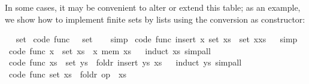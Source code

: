 \begin{isabellebody}
\begin{isamarkuptext}
  In some cases, it may be convenient to alter or
  extend this table;  as an example, we show
  how to implement finite sets by lists
  using the conversion 
  as constructor:%
\end{isamarkuptext}%
\isamarkuptrue%
\ %
\isadelimML
%
\endisadelimML
%
\isatagML
%
\endisatagML
{\isafoldML}%
%
\isadelimML
%
\endisadelimML
\isanewline
{}\isamarkupfalse%
\ set\isanewline
\isanewline
{}\isamarkupfalse%
\ {\isacharbrackleft}code\ func{\isacharbrackright}{\isacharcolon}\ {\isachardoublequoteopen}{\isacharbraceleft}{\isacharbraceright}\ {\isacharequal}\ set\ {\isacharbrackleft}{\isacharbrackright}{\isachardoublequoteclose}%
\isadelimproof
\ %
\endisadelimproof
%
\isatagproof
{}\isamarkupfalse%
\ simp%
\endisatagproof
{\isafoldproof}%
%
\isadelimproof
%
\endisadelimproof
\isanewline
\isanewline
{}\isamarkupfalse%
\ {\isacharbrackleft}code\ func{\isacharbrackright}{\isacharcolon}\ {\isachardoublequoteopen}insert\ x\ {\isacharparenleft}set\ xs{\isacharparenright}\ {\isacharequal}\ set\ {\isacharparenleft}x{\isacharhash}xs{\isacharparenright}{\isachardoublequoteclose}%
\isadelimproof
\ %
\endisadelimproof
%
\isatagproof
{}\isamarkupfalse%
\ simp%
\endisatagproof
{\isafoldproof}%
%
\isadelimproof
%
\endisadelimproof
\isanewline
\isanewline
{}\isamarkupfalse%
\ {\isacharbrackleft}code\ func{\isacharbrackright}{\isacharcolon}\ {\isachardoublequoteopen}x\ {\isasymin}\ set\ xs\ {\isasymlongleftrightarrow}\ x\ mem\ xs{\isachardoublequoteclose}%
\isadelimproof
\ %
\endisadelimproof
%
\isatagproof
{}\isamarkupfalse%
\ {\isacharparenleft}induct\ xs{\isacharparenright}\ simp{\isacharunderscore}all%
\endisatagproof
{\isafoldproof}%
%
\isadelimproof
%
\endisadelimproof
\isanewline
\isanewline
{}\isamarkupfalse%
\ {\isacharbrackleft}code\ func{\isacharbrackright}{\isacharcolon}\ {\isachardoublequoteopen}xs\ {\isasymunion}\ set\ ys\ {\isacharequal}\ foldr\ insert\ ys\ xs{\isachardoublequoteclose}%
\isadelimproof
\ %
\endisadelimproof
%
\isatagproof
{}\isamarkupfalse%
\ {\isacharparenleft}induct\ ys{\isacharparenright}\ simp{\isacharunderscore}all%
\endisatagproof
{\isafoldproof}%
%
\isadelimproof
%
\endisadelimproof
\isanewline
\isanewline
{}\isamarkupfalse%
\ {\isacharbrackleft}code\ func{\isacharbrackright}{\isacharcolon}\ {\isachardoublequoteopen}{\isasymUnion}set\ xs\ {\isacharequal}\ foldr\ {\isacharparenleft}op\ {\isasymunion}{\isacharparenright}\ xs\ {\isacharbraceleft}{\isacharbraceright}{\isachardoublequoteclose}%

\end{isabellebody}
